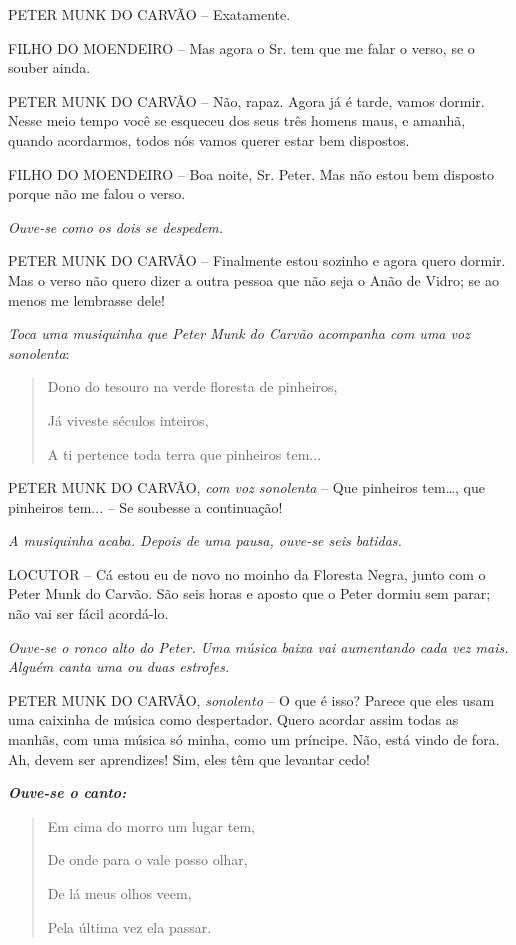 PETER MUNK DO CARVÃO -- Exatamente.

FILHO DO MOENDEIRO -- Mas agora o Sr. tem que me falar o verso, se o
souber ainda.

PETER MUNK DO CARVÃO -- Não, rapaz. Agora já é tarde, vamos dormir.
Nesse meio tempo você se esqueceu dos seus três homens maus, e amanhã,
quando acordarmos, todos nós vamos querer estar bem dispostos.

FILHO DO MOENDEIRO -- Boa noite, Sr. Peter. Mas não estou bem disposto
porque não me falou o verso.

\emph{Ouve-se como os dois se despedem.}

PETER MUNK DO CARVÃO -- Finalmente estou sozinho e agora quero dormir.
Mas o verso não quero dizer a outra pessoa que não seja o Anão de Vidro;
se ao menos me lembrasse dele!

\emph{Toca uma musiquinha que Peter Munk do Carvão acompanha com uma voz
sonolenta}:

\begin{quote}
Dono do tesouro na verde floresta de pinheiros,

Já viveste séculos inteiros,

A ti pertence toda terra que pinheiros tem...
\end{quote}

PETER MUNK DO CARVÃO, \emph{com voz sonolenta} -- Que pinheiros
tem\ldots{}, que pinheiros tem... -- Se soubesse a continuação!

\emph{A musiquinha acaba. Depois de uma pausa, ouve-se seis batidas.}

LOCUTOR -- Cá estou eu de novo no moinho da Floresta Negra, junto com o
Peter Munk do Carvão. São seis horas e aposto que o Peter dormiu sem
parar; não vai ser fácil acordá-lo.

\emph{Ouve-se o ronco alto do Peter. Uma música baixa vai aumentando
cada vez mais. Alguém canta uma ou duas estrofes.}

PETER MUNK DO CARVÃO, \emph{sonolento} -- O que é isso? Parece que eles
usam uma caixinha de música como despertador. Quero acordar assim todas
as manhãs, com uma música só minha, como um príncipe. Não, está vindo de
fora. Ah, devem ser aprendizes! Sim, eles têm que levantar cedo!

\emph{\textbf{Ouve-se o canto: }}

\begin{quote}
Em cima do morro um lugar tem,

De onde para o vale posso olhar,

De lá meus olhos veem,

Pela última vez ela passar.
\end{quote}

